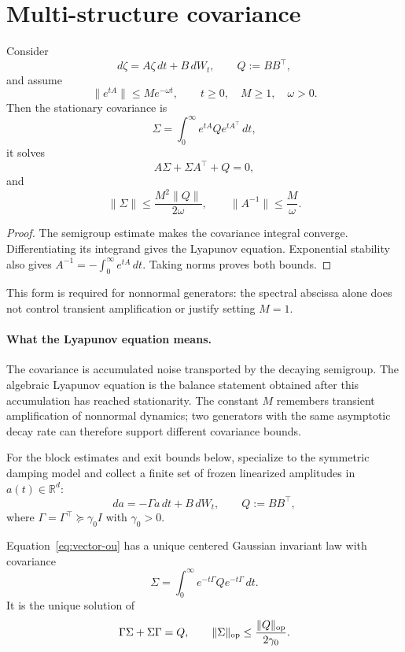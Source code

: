 \documentclass[11pt]{article}
\begin{document}
\section{Multi-structure covariance}

\begin{theorem}
\label{thm:semigroup-covariance}
Consider
\[
 d\zeta=A\zeta\,dt+B\,dW_t,\qquad Q:=BB^\top,
\]
and assume
\[
 \|e^{tA}\|\le M e^{-\omega t},
 \qquad t\ge0,\quad M\ge1,\quad\omega>0.
\]
Then the stationary covariance is
\[
 \Sigma=\int_0^\infty e^{tA}Qe^{tA^\top}\,dt,
\]
it solves
\[
 A\Sigma+\Sigma A^\top+Q=0,
\]
and
\[
 \|\Sigma\|\le\frac{M^2\|Q\|}{2\omega},
 \qquad
 \|A^{-1}\|\le\frac{M}{\omega}.
\]
\end{theorem}

\begin{proof}
The semigroup estimate makes the covariance integral converge. Differentiating
its integrand gives the Lyapunov equation. Exponential stability also gives
$A^{-1}=-\int_0^\infty e^{tA}\,dt$. Taking norms proves both bounds.
\end{proof}

This form is required for nonnormal generators: the spectral abscissa alone
does not control transient amplification or justify setting $M=1$.

\paragraph{What the Lyapunov equation means.}
The covariance is accumulated noise transported by the decaying semigroup.
The algebraic Lyapunov equation is the balance statement obtained after this
accumulation has reached stationarity.  The constant $M$ remembers transient
amplification of nonnormal dynamics; two generators with the same asymptotic
decay rate can therefore support different covariance bounds.

For the block estimates and exit bounds below, specialize to the symmetric
damping model and collect a finite set of frozen linearized amplitudes in
$a(t)\in\mathbb R^d$:
\begin{equation}
 da=-\Gamma a\,dt+B\,dW_t,
 \qquad Q:=BB^\top,
 \label{eq:vector-ou}
\end{equation}
where $\Gamma=\Gamma^\top\succeq\gamma_0 I$ with $\gamma_0>0$.

\begin{corollary}\label{thm:covariance}
Equation~\eqref{eq:vector-ou} has a unique centered Gaussian invariant law
with covariance
\[
 \Sigma=\int_0^\infty e^{-t\Gamma}Qe^{-t\Gamma}\,dt .
\]
It is the unique solution of
\[
 \Gamma\Sigma+\Sigma\Gamma=Q,
 \qquad \|\Sigma\|_{\rm op}\le\frac{\|Q\|_{\rm op}}{2\gamma_0}.
\]
\end{corollary}
\end{document}
